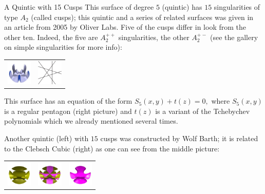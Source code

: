 \begin{surferPage}{A Quintic with 15 Cusps}
  This surface of degree $5$ (quintic) has $15$ singularities of type $A_2$
    (called cusps); this quintic and a series of related surfaces was given in
    an article from 2005 by Oliver Labs.
    Five of the cusps differ in look from the other ten.
    Indeed, the five are $A_2^{++}$ singularities, the other $A_2^{+-}$ (see
    the gallery on simple singularities for more info):

     \vspace*{-0.3em}
    \begin{center}
      \begin{tabular}{c@{\qquad}c}
        \includegraphics[height=1.2cm]{./../../common/images/dessins_quint_15a2}
        &
        \includegraphics[height=1.2cm]{./../../common/images/rp5.pdf}
      \end{tabular}
    \end{center}
    \vspace*{-0.3em}    
    
    This surface has an equation of the form 
    $S_5(x,y) + t(z)=0,$
    where $S_5(x,y)$ is a regular pentagon (right picture) and $t(z)$ is a
    variant of the Tchebychev polynomials which we already mentioned several
    times.

     Another quintic (left) with $15$ cusps was constructed by
    Wolf Barth; it is related to the Clebsch Cubic (right) as one can see from the
    middle picture:

    \vspace*{-0.3em}
    \begin{center}
      \begin{tabular}{c@{\quad}c@{\quad}c}
        \includegraphics[height=1.2cm]{./../../common/images/barthquintic_green}
        &
        \includegraphics[height=1.2cm]{./../../common/images/barthquintic_clebschcubic}
        &
        \includegraphics[height=1.2cm]{./../../common/images/clebschcubic_pink}
      \end{tabular}
    \end{center}
    \vspace*{-0.3em}
\end{surferPage}
